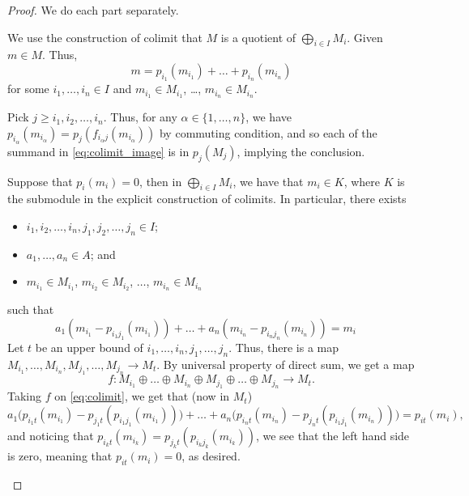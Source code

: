 \begin{proof}
    We do each part separately.
    \begin{alphenum}
    \item We use the construction of colimit that 
    $M$ is a quotient of $\bigoplus_{i\in I} M_i$.
    Given $m\in M$.
    Thus, 
    \begin{equation}
    \label{eq:colimit_image}
    m = p_{i_1}(m_{i_1}) + \dots + p_{i_n}(m_{i_n})
    \end{equation}
    for some $i_1,\dots,i_n\in I$ and $m_{i_1}\in M_{i_1}$,
    \dots, $m_{i_n}\in M_{i_n}$.
    
    Pick $j\geq i_1,i_2,\dots,i_n$.
    Thus, for any $\alpha\in\{1,\dots,n\}$,
    we have $p_{i_\alpha}(m_{i_\alpha})
    = p_j(f_{i_{\alpha}j}(m_{i_\alpha}))$
    by commuting condition,
    and so each of the summand in \eqref{eq:colimit_image} is in
    $p_j(M_j)$, implying the conclusion.
    \item Suppose that $p_i(m_i)=0$, then in $\bigoplus_{i\in I} M_i$, 
    we have that $m_i\in K$, where $K$ is the submodule
    in the explicit construction of colimits.
	In particular, there exists
	\begin{itemize}
	\item $i_1,i_2,\dots,i_n,j_1,j_2,\dots,j_n\in I$;
	\item $a_1,\dots,a_n\in A$; and
	\item $m_{i_1}\in M_{i_1}$, $m_{i_2}\in M_{i_2}$, 
	$\dots$, $m_{i_n}\in M_{i_n}$
	\end{itemize}
	such that
	\begin{equation}
    \label{eq:colimit}
    a_1(m_{i_1} - p_{i_1j_1}(m_{i_1}))
	+ \dots + a_n(m_{i_n} - p_{i_nj_n}(m_{i_n})) = m_i\quad \end{equation}
	Let $t$ be an upper bound of $i_1,\dots,i_n,j_1,\dots,j_n$.
	Thus, there is a map $M_{i_1},\dots,M_{i_n},M_{j_1},\dots,M_{j_n}\to
	M_t$. By universal property of direct sum,
	we get a map
	$$f : M_{i_1}\oplus \dots \oplus M_{i_n}\oplus M_{j_1}\oplus\dots\oplus
	M_{j_n}\to M_t.$$
	Taking $f$ on \eqref{eq:colimit}, we get that (now in $M_t$)
	$$a_1\big(p_{i_1t}(m_{i_1}) - p_{j_1t}(p_{i_1j_1}(m_{i_1}))\big)
	+ \dots
	+ a_n\big(p_{i_nt}(m_{i_n}) - p_{j_nt}(p_{i_1j_1}(m_{i_n}))\big)
	= p_{it}(m_i),$$
	and noticing that $p_{i_kt}(m_{i_k}) = p_{j_kt}(p_{i_kj_k}(m_{i_k}))$,
	we see that the left hand side is zero, meaning that
	$p_{it}(m_i)=0$, as desired. \qedhere
    \end{alphenum}
\end{proof}

